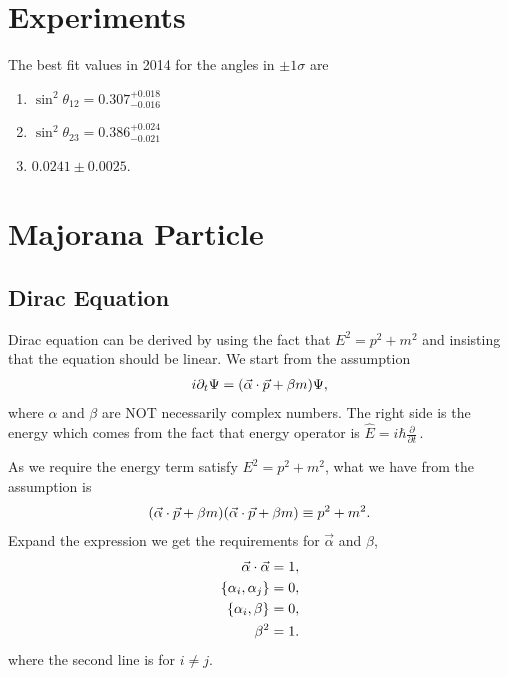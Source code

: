 \documentclass[letterpaper,12pt,english]{sphinxmanual}
\begin{document}
\section{Experiments}
\label{mass:experiments}
The best fit values in 2014 for the angles in \(\pm 1\sigma\) are
\begin{enumerate}
\item {} 
\(\sin^2\theta_{12}=0.307^{+ 0.018}_{-0.016}\)

\item {} 
\(\sin^2\theta_{23} = 0.386^{+0.024}_{-0.021}\)

\item {} 
\(0.0241\pm 0.0025\).

\end{enumerate}


\section{Majorana Particle}
\label{mass:index-0}\label{mass:majorana-particle}

\subsection{Dirac Equation}
\label{mass:dirac-equation}
Dirac equation can be derived by using the fact that \(E^2=p^2+m^2\) and insisting that the equation should be linear. We start from the assumption
\begin{gather}
\begin{split}i\partial_t \Psi = (\vec\alpha\cdot \vec p + \beta m)\Psi,\end{split}\notag
\end{gather}
where \(\alpha\) and \(\beta\) are NOT necessarily complex numbers. The right side is the energy which comes from the fact that energy operator is \(\hat{E} = i\hbar\frac{\partial}{\partial t} \,\!\).

As we require the energy term satisfy \(E^2=p^2+m^2\), what we have from the assumption is
\begin{gather}
\begin{split}(\vec\alpha\cdot \vec p + \beta m)(\vec\alpha\cdot \vec p + \beta m) \equiv p^2 + m^2.\end{split}\notag
\end{gather}
Expand the expression we get the requirements for \(\vec\alpha\) and \(\beta\),
\begin{gather}
\begin{split}\vec\alpha\cdot\vec \alpha &= 1, \\
\{\alpha_i,\alpha_j\} &= 0, \\
\{\alpha_i,\beta \} & = 0 ,\\
\beta^2 & = 1.\end{split}\notag
\end{gather}
where the second line is for \(i\neq j\).
\end{document}
